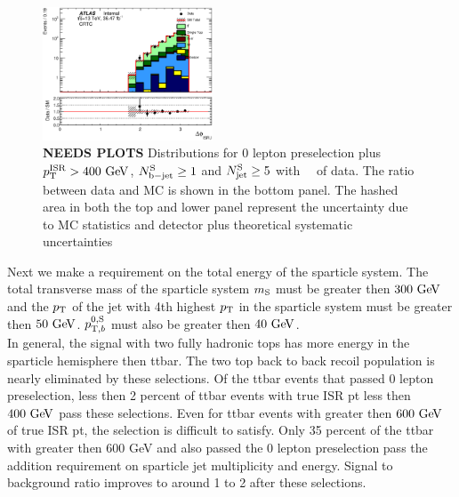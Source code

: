 \begin{figure}[htbp]
\begin{center}
        \includegraphics[width=0.45\textwidth]{figures/ttbar/postfit/CA_dphiISRI_CRTopC_log}
  \end{center}
  \caption{{\bf NEEDS PLOTS} Distributions for 0 lepton preselection plus $\pTISR > 400 \gev$, $N_{\mathrm{b-jet}}^{\mathrm{S}}\ge1$  and $N_{\mathrm{jet}}^{\mathrm{S}}\ge5$ with \intlumi\ \ifb\ of data. The ratio between data and MC is shown in the bottom panel. The hashed area in both the top and lower panel represent the uncertainty due to MC statistics and detector plus theoretical systematic uncertainties}
  \label{fig:SR:jetMultiplicity}
\end{figure}

\indent Next we make a requirement on the total energy of the sparticle system.  The total transverse mass of the sparticle system $m_{\mathrm{S}}$ must be greater then $300 \gev$ and the $p_{\mathrm{T}}$ of the jet with 4th highest $p_{\mathrm{T}}$ in the sparticle system must be greater then $50 \gev$.  $p_{\mathrm{T},b}^{0,\mathrm{S}}$ must also be greater then $40 \gev$.   \\

\indent In general, the signal with two fully hadronic tops has more energy in the sparticle hemisphere then ttbar.  The two top back to back recoil population is nearly eliminated by these selections.  Of the ttbar events that passed 0 lepton preselection, less then 2 percent of ttbar events with true ISR pt less then $400 \gev$ pass these selections.  Even for ttbar events with greater then $600 \gev$ of true ISR pt, the selection is difficult to satisfy.  Only 35 percent of the ttbar with greater then 600 GeV and also passed the 0 lepton preselection pass the addition requirement on sparticle jet multiplicity and energy.  Signal to background ratio improves to around 1 to 2 after these selections. \\

